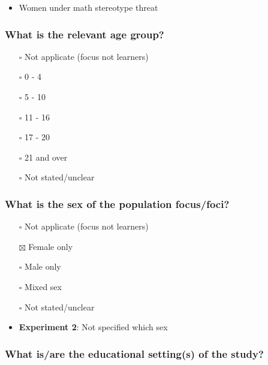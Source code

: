 \documentclass[
  doc, a4paper]{apa7}
\providecommand{\tightlist}{%
  \setlength{\itemsep}{0pt}\setlength{\parskip}{0pt}}
\begin{document}
\begin{itemize}
\tightlist
\item
  Women under math stereotype threat
\end{itemize}

\subsubsection{What is the relevant age group?}\label{what-is-the-relevant-age-group}

\begin{itemize}
\tightlist
\item[$\square$]
  Not applicate (focus not learners)\\
\item[$\square$]
  0 - 4\\
\item[$\square$]
  5 - 10\\
\item[$\square$]
  11 - 16\\
\item[$\square$]
  17 - 20\\
\item[$\square$]
  21 and over\\
\item[$\square$]
  Not stated/unclear
\end{itemize}

\subsubsection{What is the sex of the population focus/foci?}\label{what-is-the-sex-of-the-population-focusfoci}

\begin{itemize}
\item[$\square$]
  Not applicate (focus not learners)\\
\item[$\boxtimes$]
  Female only\\
\item[$\square$]
  Male only\\
\item[$\square$]
  Mixed sex\\
\item[$\square$]
  Not stated/unclear
\item
  \textbf{Experiment 2}: Not specified which sex
\end{itemize}

\subsubsection{What is/are the educational setting(s) of the study?}\label{what-isare-the-educational-settings-of-the-study}
\end{document}
